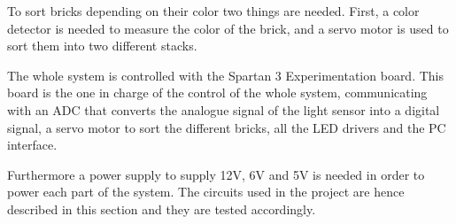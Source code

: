 To sort bricks depending on their color two things are needed. 
First, a color detector is needed to measure the color of the brick, and a servo motor is used to sort them into two different stacks.

The whole system is controlled with the Spartan 3 Experimentation board.
This board is the one in charge of the control of the whole system, communicating with an ADC that converts the analogue signal of the light sensor into a digital signal, a servo motor to sort the different bricks, all the LED drivers and the PC interface.

Furthermore a power supply to supply 12V, 6V and 5V is needed in order to power each part of the system.
The circuits used in the project are hence described in this section and they are tested accordingly.
